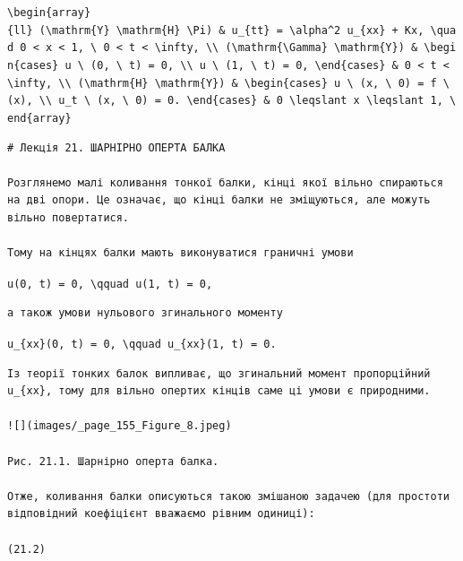 \documentclass[
  ukrainian,
]{article}
\begin{document}
\texttt{\textbackslash{}begin\{array\}\{ll\}\ (\textbackslash{}mathrm\{Y\}\ \textbackslash{}mathrm\{H\}\ \textbackslash{}Pi)\ \&\ u\_\{tt\}\ =\ \textbackslash{}alpha\^{}2\ u\_\{xx\}\ +\ Kx,\ \textbackslash{}quad\ 0\ \textless{}\ x\ \textless{}\ 1,\ \textbackslash{}\ 0\ \textless{}\ t\ \textless{}\ \textbackslash{}infty,\ \textbackslash{}\textbackslash{}\ (\textbackslash{}mathrm\{\textbackslash{}Gamma\}\ \textbackslash{}mathrm\{Y\})\ \&\ \textbackslash{}begin\{cases\}\ u\ \textbackslash{}\ (0,\ \textbackslash{}\ t)\ =\ 0,\ \textbackslash{}\textbackslash{}\ u\ \textbackslash{}\ (1,\ \textbackslash{}\ t)\ =\ 0,\ \textbackslash{}end\{cases\}\ \&\ 0\ \textless{}\ t\ \textless{}\ \textbackslash{}infty,\ \textbackslash{}\textbackslash{}\ (\textbackslash{}mathrm\{H\}\ \textbackslash{}mathrm\{Y\})\ \&\ \textbackslash{}begin\{cases\}\ u\ \textbackslash{}\ (x,\ \textbackslash{}\ 0)\ =\ f\ \textbackslash{}\ (x),\ \textbackslash{}\textbackslash{}\ u\_t\ \textbackslash{}\ (x,\ \textbackslash{}\ 0)\ =\ 0.\ \textbackslash{}end\{cases\}\ \&\ 0\ \textbackslash{}leqslant\ x\ \textbackslash{}leqslant\ 1,\ \textbackslash{}end\{array\}}

\begin{verbatim}
# Лекція 21. ШАРНІРНО ОПЕРТА БАЛКА

Розглянемо малі коливання тонкої балки, кінці якої вільно спираються на дві опори. Це означає, що кінці балки не зміщуються, але можуть вільно повертатися.

Тому на кінцях балки мають виконуватися граничні умови
\end{verbatim}

\texttt{u(0,\ t)\ =\ 0,\ \textbackslash{}qquad\ u(1,\ t)\ =\ 0,}

\begin{verbatim}
а також умови нульового згинального моменту
\end{verbatim}

\texttt{u\_\{xx\}(0,\ t)\ =\ 0,\ \textbackslash{}qquad\ u\_\{xx\}(1,\ t)\ =\ 0.}

\begin{verbatim}
Із теорії тонких балок випливає, що згинальний момент пропорційний u_{xx}, тому для вільно опертих кінців саме ці умови є природними.

![](images/_page_155_Figure_8.jpeg)

Рис. 21.1. Шарнірно оперта балка.

Отже, коливання балки описуються такою змішаною задачею (для простоти відповідний коефіцієнт вважаємо рівним одиниці):

(21.2)
\end{verbatim}
\end{document}
